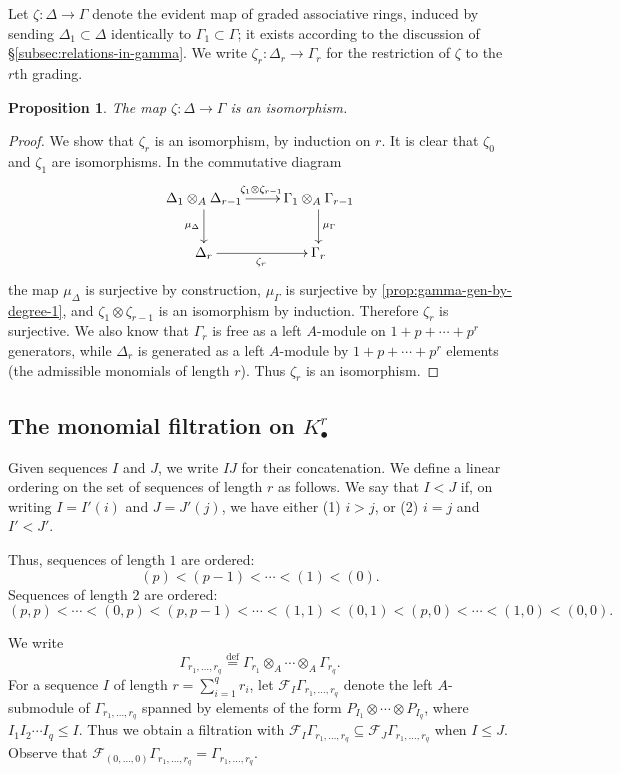 \documentclass[11pt]{amsart}
\numberwithin{equation}{section}
\theoremstyle{plain}
\newtheorem{prop}[subsection]{Proposition}
\theoremstyle{remark}
\theoremstyle{plain}
\begin{document}
Let $\zeta\colon \Delta{\rightarrow} \Gamma$ denote the evident map of
graded associative rings, induced by sending $\Delta_1\subset \Delta$
identically 
to $\Gamma_1\subset \Gamma$; it exists according to the discussion of
\S\ref{subsec:relations-in-gamma}.   We write $\zeta_r\colon
\Delta_r{\rightarrow}\Gamma_r$ for the restriction of $\zeta$ to the $r$th grading.
\begin{prop}
The map $\zeta\colon \Delta{\rightarrow} \Gamma$ is an isomorphism.
\end{prop}
\begin{proof}
We show that $\zeta_r$ is an isomorphism, by induction on $r$.
It is clear that $\zeta_0$ and $\zeta_1$ are isomorphisms.  In the
commutative diagram
\[\xymatrix{
{\Delta_1\otimes_A \Delta_{r-1}} \ar[r]^{\zeta_1\otimes \zeta_{r-1}}
\ar[d]_{\mu_\Delta} & {\Gamma_1\otimes_A 
  \Gamma_{r-1}} \ar[d]^{\mu_\Gamma}
\\
{\Delta_r} \ar[r]_{\zeta_r} & {\Gamma_r}
}\]
the map $\mu_\Delta$ is surjective by construction, $\mu_\Gamma$ is
surjective by \eqref{prop:gamma-gen-by-degree-1}, and
$\zeta_1\otimes\zeta_{r-1}$ is an 
isomorphism by induction.  Therefore $\zeta_r$ is surjective.  We also
know that $\Gamma_r$ is free as a left $A$-module on
$1+p+\cdots+p^r$ generators, while $\Delta_r$ is generated as a
left $A$-module by
$1+p+\cdots+p^r$ elements (the admissible monomials of length
$r$).  Thus $\zeta_r$ is an isomorphism.
\end{proof}

\subsection{The monomial filtration on $K^r_\bullet$}

Given sequences $I$ and $J$, we write $IJ$ for their concatenation.
We define a linear ordering on the set of sequences of length $r$ as
follows.  We say that $I<J$ if, on writing $I=I'(i)$ and $J=J'(j)$, we
have either (1) $i>j$, or (2) $i=j$ and $I'<J'$.

Thus, sequences of length $1$ are ordered:
\[
(p)<(p-1)<\cdots<(1)<(0).
\]
Sequences of length $2$ are ordered:
\[
(p,p)<\cdots<(0,p)<(p,p-1)<\cdots<(1,1)<(0,1)<(p,0)<\cdots<(1,0)<(0,0).
\]

We write 
\[
\Gamma_{r_1,\dots,r_q} {\overset{\mathrm{def}}=} \Gamma_{r_1}\otimes_A \cdots \otimes_A
\Gamma_{r_q}.
\]
For a sequence $I$ of length $r=\sum_{i=1}^qr_i$, 
let ${\mathscr{F}}_I\Gamma_{r_1,\dots,r_q}$ denote the left $A$-submodule of
$\Gamma_{r_1,\dots,r_q}$ spanned 
by elements of the form $P_{I_1}\otimes\cdots \otimes P_{I_q}$, where
$I_1I_2\cdots I_q\leq I$.  Thus we obtain a filtration with
${\mathscr{F}}_I\Gamma_{r_1,\dots,r_q}\subseteq {\mathscr{F}}_J\Gamma_{r_1,\dots,r_q}$
when $I\leq J$.  Observe that ${\mathscr{F}}_{(0,\dots,0)}\Gamma_{r_1,\dots,r_q}
= \Gamma_{r_1,\dots,r_q}$.
\end{document}
